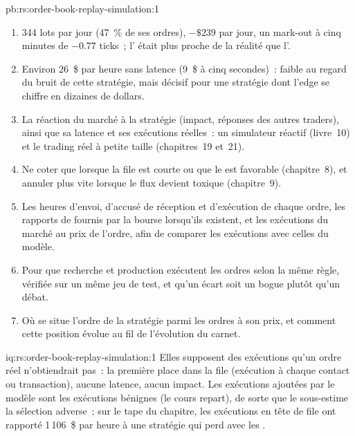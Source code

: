\begin{solution}{pb:rs:order-book-replay-simulation:1}
\begin{enumerate}
$-8$. Prob~: $-\$49$, $-42$, $-41$, $-26$ et $+33$. Avec des , le quoteur n'a d'edge à aucune latence, et son mark-out devient négatif à 50~millisecondes.
\item 344 lots par jour (47~\% de ses ordres), $-\$239$ par jour, un mark-out à cinq minutes de $-0.77$ ticks~; l' était plus proche de la réalité que l'.
\item Environ 26~\$ par heure sans latence (9~\$ à cinq secondes)~: faible au regard du bruit de cette stratégie, mais décisif pour une stratégie dont l'edge se chiffre en dizaines de dollars.
\item La réaction du marché à la stratégie (impact, réponses des autres traders), ainsi que sa latence et ses exécutions réelles~: un simulateur réactif (livre~10) et le trading réel
à petite taille (chapitres~19 et~21).
\item Ne coter que lorsque la file est courte ou que le  est favorable (chapitre~8), et annuler plus vite lorsque le flux devient toxique (chapitre~9).
\item Les heures d'envoi, d'accusé de réception et d'exécution de chaque ordre, les rapports de  fournis par la bourse lorsqu'ils existent, et les exécutions du marché au prix de l'ordre, afin
de comparer les exécutions avec celles du modèle.
\item Pour que recherche et production exécutent les ordres selon la même règle, vérifiée sur un même jeu de test, et qu'un écart soit un bogue plutôt qu'un débat.
\item Où se situe l'ordre de la stratégie parmi les ordres à son prix, et comment cette position évolue au fil de l'évolution du carnet.
\end{enumerate}
\end{solution}

\begin{solution}{iq:rs:order-book-replay-simulation:1}
Elles supposent des exécutions qu'un ordre réel n'obtiendrait pas~: la première place dans la file (exécution à chaque contact ou transaction), aucune latence, aucun impact. Les exécutions ajoutées par le modèle sont
les exécutions bénignes (le cours repart), de sorte que le  sous-estime la sélection adverse~; sur le tape du chapitre, les exécutions en tête de file ont rapporté 1\,106~\$ par heure à une stratégie
qui perd avec les .
\end{solution}

